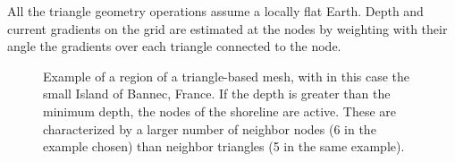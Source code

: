 All the triangle geometry operations assume a locally flat Earth. Depth and
current gradients on the grid are estimated at the nodes by weighting with
their angle the gradients over each triangle connected to the node.

\begin{figure} \begin{center}
\caption{Example of a region of a triangle-based mesh, with in this case the
 small Island of Bannec, France. If the depth is greater than the minimum
depth, the nodes of the shoreline are active. These are characterized by a
larger number of neighbor nodes (6 in the example chosen) than neighbor
triangles (5 in the same example).}
\label{fig:triangles} \botline
\end{center}
\end{figure}

